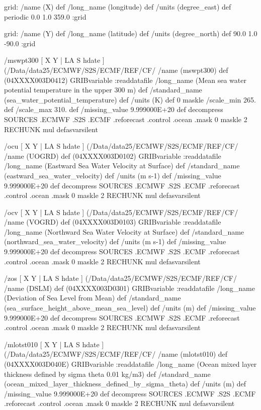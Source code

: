 \begin{ingrid}
{grid:
/name (X) def
/long_name (longitude) def
/units (degree_east) def
periodic
0.0 1.0 359.0
:grid

grid:
/name (Y) def
/long_name (latitude) def
/units (degree_north) def
90.0 1.0 -90.0
:grid

/mswpt300 { [ X Y | LA S hdate ] (/Data/data25/ECMWF/S2S/ECMF/REF/CF/%
/name (mswpt300) def
(04XXXX003D0412) GRIBvariable
:readdatafile
/long_name (Mean sea water potential temperature in the upper 300 m) def
/standard_name (sea_water_potential_temperature) def
/units (K) def
0 maskle
/scale_min 265. def
/scale_max 310. def
/missing_value 9.999000E+20 def
decompress
  SOURCES .ECMWF .S2S .ECMF .reforecast .control .ocean .mask
   0 maskle
   2 RECHUNK
   mul
} defasvarsilent

/ocu { [ X Y | LA S hdate ] (/Data/data25/ECMWF/S2S/ECMF/REF/CF/%
/name (UOGRD) def
(04XXXX003D0102) GRIBvariable
:readdatafile
/long_name (Eastward Sea Water Velocity at Surface) def
/standard_name (eastward_sea_water_velocity) def
/units (m s-1) def
/missing_value 9.999000E+20 def
decompress
  SOURCES .ECMWF .S2S .ECMF .reforecast .control .ocean .mask
   0 maskle
   2 RECHUNK
   mul
} defasvarsilent

/ocv { [ X Y | LA S hdate ] (/Data/data25/ECMWF/S2S/ECMF/REF/CF/%
/name (VOGRD) def
(04XXXX003D0103) GRIBvariable
:readdatafile
/long_name (Northward Sea Water Velocity at Surface) def
/standard_name (northward_sea_water_velocity) def
/units (m s-1) def
/missing_value 9.999000E+20 def
decompress
  SOURCES .ECMWF .S2S .ECMF .reforecast .control .ocean .mask
   0 maskle
   2 RECHUNK
   mul
} defasvarsilent

/zos { [ X Y | LA S hdate ] (/Data/data25/ECMWF/S2S/ECMF/REF/CF/%
/name (DSLM) def
(04XXXX003D0301) GRIBvariable
:readdatafile
/long_name (Deviation of Sea Level from Mean) def
/standard_name (sea_surface_height_above_mean_sea_level) def
/units (m) def
/missing_value 9.999000E+20 def
decompress
  SOURCES .ECMWF .S2S .ECMF .reforecast .control .ocean .mask
   0 maskle
   2 RECHUNK
   mul
} defasvarsilent

/mlotst010 { [ X Y | LA S hdate ] (/Data/data25/ECMWF/S2S/ECMF/REF/CF/%
/name (mlotst010) def
(04XXXX003D040E) GRIBvariable 
:readdatafile
/long_name (Ocean mixed layer thickness defined by sigma theta 0.01 kg/m3) def
/standard_name (ocean_mixed_layer_thickness_defined_by_sigma_theta) def
/units (m) def
/missing_value 9.999000E+20 def
decompress
  SOURCES .ECMWF .S2S .ECMF .reforecast .control .ocean .mask
   0 maskle
   2 RECHUNK
   mul
} defasvarsilent

}
\end{ingrid}
